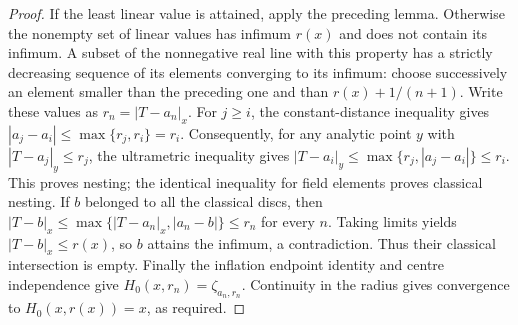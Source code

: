 \begin{proof}
If the least linear value is attained, apply the preceding lemma. Otherwise
the nonempty set of linear values has infimum $r(x)$ and does not contain
its infimum. A subset of the nonnegative real line with this property has
a strictly decreasing sequence of its elements converging to its infimum:
choose successively an element smaller than the preceding one and than
$r(x)+1/(n+1)$. Write these values as $r_n=|T-a_n|_x$.
For $j\ge i$, the constant-distance inequality gives
$|a_j-a_i|\le\max\{r_j,r_i\}=r_i$. Consequently, for any analytic point
$y$ with $|T-a_j|_y\le r_j$, the ultrametric inequality gives
$|T-a_i|_y\le\max\{r_j,|a_j-a_i|\}\le r_i$. This proves nesting;
the identical inequality for field elements proves classical nesting.
If $b$ belonged to all the classical discs, then
$|T-b|_x\le\max\{|T-a_n|_x,|a_n-b|\}\le r_n$ for every $n$.
Taking limits yields $|T-b|_x\le r(x)$, so $b$ attains the infimum,
a contradiction. Thus their classical intersection is empty.
Finally the inflation endpoint identity and centre independence give
$H_0(x,r_n)=\zeta_{a_n,r_n}$. Continuity in the radius gives convergence
to $H_0(x,r(x))=x$, as required.
\end{proof}
